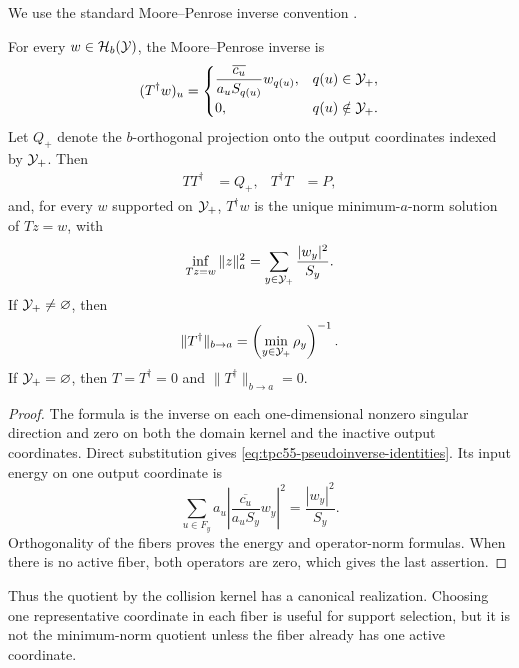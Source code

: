 We use the standard Moore--Penrose inverse convention
\cite{BenIsraelGreville2003}.

\begin{theorem}
\label{thm:tpc55-pseudoinverse}
For every \(w\in\mathcal H_b(\mathcal Y)\), the Moore--Penrose inverse is
\begin{equation}
 (T^\dagger w)_u
 =
 \begin{cases}
 \dfrac{\overline{c_u}}{a_uS_{q(u)}}w_{q(u)},
   &q(u)\in\mathcal Y_+,\\[6pt]
 0,&q(u)\notin\mathcal Y_+.
 \end{cases}
 \label{eq:tpc55-pseudoinverse-formula}
\end{equation}
Let \(Q_+\) denote the \(b\)-orthogonal projection onto the output
coordinates indexed by \(\mathcal Y_+\).  Then
\begin{align}
 TT^\dagger&=Q_+,
 &T^\dagger T&=P,
 \label{eq:tpc55-pseudoinverse-identities}
\end{align}
and, for every \(w\) supported on \(\mathcal Y_+\), \(T^\dagger w\) is the unique
minimum-\(a\)-norm solution of \(Tz=w\), with
\begin{equation}
 \inf_{Tz=w}\|z\|_a^2
 =\sum_{y\in\mathcal Y_+}\frac{|w_y|^2}{S_y}.
 \label{eq:tpc55-minimum-lift-energy}
\end{equation}
If \(\mathcal Y_+\ne\varnothing\), then
\begin{equation}
 \|T^\dagger\|_{b\to a}
 =\left(\min_{y\in\mathcal Y_+}\rho_y\right)^{-1}.
 \label{eq:tpc55-pseudoinverse-norm}
\end{equation}
If \(\mathcal Y_+=\varnothing\), then \(T=T^\dagger=0\) and
\(\|T^\dagger\|_{b\to a}=0\).
\end{theorem}

\begin{proof}
The formula is the inverse on each one-dimensional nonzero singular
direction and zero on both the domain kernel and the inactive output
coordinates.  Direct substitution gives
\eqref{eq:tpc55-pseudoinverse-identities}.  Its input energy on one output
coordinate is
\[
 \sum_{u\in F_y}a_u
 \left|\frac{\overline{c_u}}{a_uS_y}w_y\right|^2
 =\frac{|w_y|^2}{S_y}.
\]
Orthogonality of the fibers proves the energy and operator-norm formulas.
When there is no active fiber, both operators are zero, which gives the last
assertion.
\end{proof}

Thus the quotient by the collision kernel has a canonical realization.
Choosing one representative coordinate in each fiber is useful for support
selection, but it is not the minimum-norm quotient unless the fiber already
has one active coordinate.

